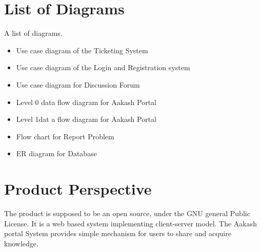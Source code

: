 \documentclass[letterpaper,10pt,english]{sphinxmanual}
\begin{document}
\chapter{List of Diagrams}
\label{unifieddoc:list-of-diagrams}
A list of diagrams.
\begin{itemize}
\item {} 
Use case diagram of the Ticketing System

\item {} 
Use case diagram of the Login and Registration system

\item {} 
Use case diagram for Discussion Forum

\item {} 
Level 0 data flow diagram for Aakash Portal

\item {} 
Level 1dat a flow diagram for Aakash Portal

\item {} 
Flow chart for Report Problem

\item {} 
ER diagram for Database

\end{itemize}


\chapter{Product Perspective}
\label{unifieddoc:product-perspective}
The product is supposed to be an open source, under the GNU general Public License. It is a web based system implementing client-server model. The Aakash portal System provides simple mechanism for users to share and acquire knowledge.
\end{document}
